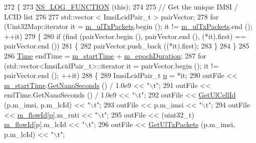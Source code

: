 \begin{DoxyCode}
272 \{
273   \hyperlink{log-macros-disabled_8h_a90b90d5bad1f39cb1b64923ea94c0761}{NS\_LOG\_FUNCTION} (\textcolor{keyword}{this});
274 
275   \textcolor{comment}{// Get the unique IMSI / LCID list}
276 
277   std::vector < ImsiLcidPair\_t > pairVector;
278   \textcolor{keywordflow}{for} (Uint32Map::iterator it = \hyperlink{classns3_1_1RadioBearerStatsCalculator_a00874c8bd4409c6bbdbccc6be27058ee}{m\_ulTxPackets}.begin (); it != 
      \hyperlink{classns3_1_1RadioBearerStatsCalculator_a00874c8bd4409c6bbdbccc6be27058ee}{m\_ulTxPackets}.end (); ++it)
279     \{
280       \textcolor{keywordflow}{if} (find (pairVector.begin (), pairVector.end (), (*it).first) == pairVector.end ())
281         \{
282           pairVector.push\_back ((*it).first);
283         \}
284     \}
285 
286   \hyperlink{namespacens3_1_1TracedValueCallback_a7ffd3e7c142ffe7c8a1d2db9b8de38ec}{Time} endTime = \hyperlink{classns3_1_1RadioBearerStatsCalculator_a421041c2860801f4b5f9aa55869755c6}{m\_startTime} + \hyperlink{classns3_1_1RadioBearerStatsCalculator_ac510d632d9e9bafa59a07df7674ba7de}{m\_epochDuration};
287   \textcolor{keywordflow}{for} (std::vector<ImsiLcidPair\_t>::iterator it = pairVector.begin (); it != pairVector.end (); ++it)
288     \{
289       ImsiLcidPair\_t \hyperlink{lte__link__budget_8m_ac9de518908a968428863f829398a4e62}{p} = *it;
290       outFile << \hyperlink{classns3_1_1RadioBearerStatsCalculator_a421041c2860801f4b5f9aa55869755c6}{m\_startTime}.\hyperlink{classns3_1_1Time_a2fdb7bf0e1f5cd93b6149cb37bbb7f08}{GetNanoSeconds} () / 1.0e9 << \textcolor{stringliteral}{"\(\backslash\)t"};
291       outFile << endTime.GetNanoSeconds () / 1.0e9 << \textcolor{stringliteral}{"\(\backslash\)t"};
292       outFile << \hyperlink{classns3_1_1RadioBearerStatsCalculator_a22c3a359fc34f3143bbdbe1542ac1de7}{GetUlCellId} (p.m\_imsi, p.m\_lcId) << \textcolor{stringliteral}{"\(\backslash\)t"};
293       outFile << p.m\_imsi << \textcolor{stringliteral}{"\(\backslash\)t"};
294       outFile << \hyperlink{classns3_1_1RadioBearerStatsCalculator_aab26a340278a0dcfb541f2d98917c9a0}{m\_flowId}[\hyperlink{lte__link__budget_8m_ac9de518908a968428863f829398a4e62}{p}].m\_rnti << \textcolor{stringliteral}{"\(\backslash\)t"};
295       outFile << (uint32\_t) \hyperlink{classns3_1_1RadioBearerStatsCalculator_aab26a340278a0dcfb541f2d98917c9a0}{m\_flowId}[p].m\_lcId << \textcolor{stringliteral}{"\(\backslash\)t"};
296       outFile << \hyperlink{classns3_1_1RadioBearerStatsCalculator_adda2177219a76bd981c6f4b555308027}{GetUlTxPackets} (p.m\_imsi, p.m\_lcId) << \textcolor{stringliteral}{"\(\backslash\)t"};

\end{DoxyCode}
